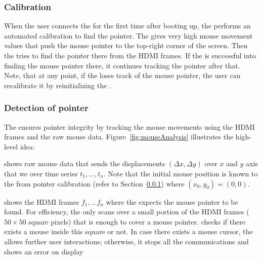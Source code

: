 \subsubsection{\bfseries Calibration}\label{sec:systemDesign:analysis:calibration} When the user connects the \device for the first time after booting up, the \device performs an automated calibration to find the pointer. The \device gives very high mouse movement values that push the mouse pointer to the top-right corner of the screen. Then the \device tries to find the pointer there from the HDMI frames. If the \device is successful into finding the mouse pointer there, it continues tracking the pointer after that. Note, that at any point, if the \device loses track of the mouse pointer, the user can recalibrate it by reinitializing the \device.

\subsubsection{\bfseries Detection of pointer} The \device ensures pointer integrity by tracking the mouse movements using the HDMI frames and the raw mouse data. Figure~\ref{fig:mouseAnalysis} illustrates the high-level idea: 

\begin{mylist}
\item[]\one shows raw mouse data that sends the displacements $(\Delta x, \Delta y)$ over $x$ and $y$ axis that we over time series $t_1,\ldots, t_n$. Note that the initial mouse position is known to the \device from pointer calibration (refer to Section~\ref{sec:systemDesign:analysis:calibration}) where $(x_0, y_0) = (0, 0)$.  
\item[]\two shows the HDMI frames $f_1,\ldots f_n$ where the \device expects the mouse pointer to be found. For efficiency, the \device only scans over a small portion of the HDMI frames ($50 \times 50$ square pixels) that is enough to cover a mouse pointer. \device checks if there exists a mouse inside this square or not. In case there exists a mouse cursor, the \device allows further user interactions; otherwise, it stops all the communications and shows an error on display
\end{mylist}


